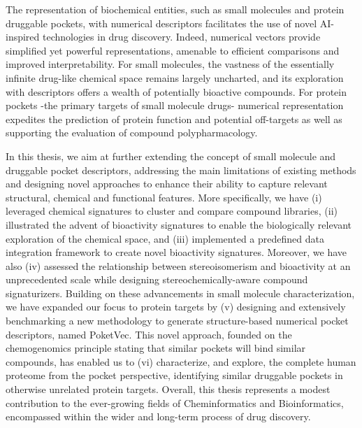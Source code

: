 
The representation of biochemical entities, such as small molecules and protein druggable pockets, with numerical descriptors facilitates the use of novel AI-inspired technologies in drug discovery. Indeed, numerical vectors provide simplified yet powerful representations, amenable to efficient comparisons and improved interpretability. For small molecules, the vastness of the essentially infinite drug-like chemical space remains largely uncharted, and its exploration with descriptors offers a wealth of potentially bioactive compounds. For protein pockets -the primary targets of small molecule drugs- numerical representation expedites the prediction of protein function and potential off-targets as well as supporting the evaluation of compound polypharmacology.  

In this thesis, we aim at further extending the concept of small molecule and druggable pocket descriptors, addressing the main limitations of existing methods and designing novel approaches to enhance their ability to capture relevant structural, chemical and functional features. More specifically, we have (i) leveraged chemical signatures to cluster and compare compound libraries, (ii) illustrated the advent of bioactivity signatures to enable the biologically relevant exploration of the chemical space, and (iii) implemented a predefined data integration framework to create novel bioactivity signatures. Moreover, we have also (iv) assessed the relationship between stereoisomerism and bioactivity at an unprecedented scale while designing stereochemically-aware compound signaturizers. Building on these advancements in small molecule characterization, we have expanded our focus to protein targets by (v) designing and extensively benchmarking a new methodology to generate structure-based numerical pocket descriptors, named PoketVec. This novel approach, founded on the chemogenomics principle stating that similar pockets will bind similar compounds, has enabled us to (vi) characterize, and explore, the complete human proteome from the pocket perspective, identifying similar druggable pockets in otherwise unrelated protein targets. Overall, this thesis represents a modest contribution to the ever-growing fields of Cheminformatics and Bioinformatics, encompassed within the wider and long-term process of drug discovery. 